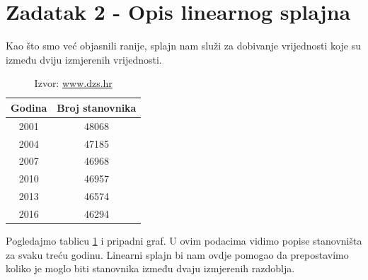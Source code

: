 \documentclass[12pt,a4paper]{report}
\begin{document}
	\section{Zadatak 2 - Opis linearnog splajna}
	
	Kao što smo već objasnili ranije, splajn nam služi za dobivanje vrijednosti koje su između dviju izmjerenih vrijednosti.
	
	\begin{minipage}{0.4\textwidth}
	\begin{table}[H]
		\begin{tabular}{c c}
			Godina&Broj stanovnika\\\hline
			2001	&	48068	\\
			2004	&	47185	\\
			2007	&	46968	\\
			2010	&	46957	\\
			2013	&	46574	\\
			2016	&	46294	\\
			
		\end{tabular}
	\caption{Izvor: \url{www.dzs.hr}}
	\label{dzsStan}
	\end{table}
	\end{minipage}
	\begin{minipage}{0.6\textwidth}

	
	\end{minipage}
	Pogledajmo tablicu \ref{dzsStan} i pripadni graf. U ovim podacima vidimo popise stanovništa za svaku treću godinu. Linearni splajn bi nam ovdje pomogao da prepostavimo koliko je moglo biti stanovnika između dvaju izmjerenih razdoblja.
	
\end{document}
